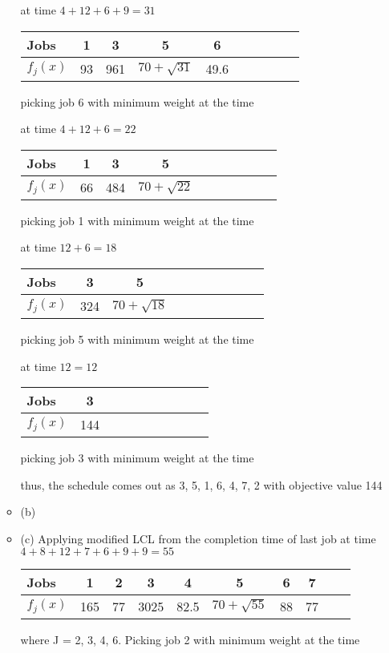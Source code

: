 \documentclass[12pt]{article}
\begin{document}
\begin{enumerate}
\begin{itemize}
at time $4 + 12 + 6 + 9 = 31$
\begin{center}
\begin{tabular}{l*{8}{c}r}
Jobs          & 1 & 3 & 5 & 6                                       \\
\hline
$f_{j}(x)$    & 93 & 961 & $70 + \sqrt{31}$ & 49.6               \\
\end{tabular}
\end{center}
picking job 6 with minimum weight at the time

at time $4 + 12 + 6 = 22$
\begin{center}
\begin{tabular}{l*{8}{c}r}
Jobs          & 1 & 3 & 5                                 \\
\hline
$f_{j}(x)$    & 66 & 484 & $70 + \sqrt{22}$               \\
\end{tabular}
\end{center}
picking job 1 with minimum weight at the time

at time $12 + 6 = 18$
\begin{center}
\begin{tabular}{l*{8}{c}r}
Jobs          & 3 & 5                                 \\
\hline
$f_{j}(x)$    & 324 & $70 + \sqrt{18}$                \\
\end{tabular}
\end{center}
picking job 5 with minimum weight at the time

at time $12 = 12$
\begin{center}
\begin{tabular}{l*{8}{c}r}
Jobs          & 3                      \\
\hline
$f_{j}(x)$    & 144                    \\
\end{tabular}
\end{center}
picking job 3 with minimum weight at the time

thus, the schedule comes out as 3, 5, 1, 6, 4, 7, 2 with objective value 144

\item{(b)}


\item{(c)}
Applying modified LCL from the completion time of last job at time $4 + 8 + 12 + 7 + 6 + 9 + 9 = 55$
\begin{center}
\begin{tabular}{l*{8}{c}r}
Jobs          & 1 & 2 & 3 & 4 & 5 & 6 & 7                                         \\
\hline
$f_{j}(x)$    & 165 & 77 & 3025 & 82.5 & $70 + \sqrt{55}$ & 88 & 77               \\
\end{tabular}
\end{center}
where J = 2, 3, 4, 6. Picking job 2 with minimum weight at the time


\end{itemize}
\end{enumerate}
\end{document}
